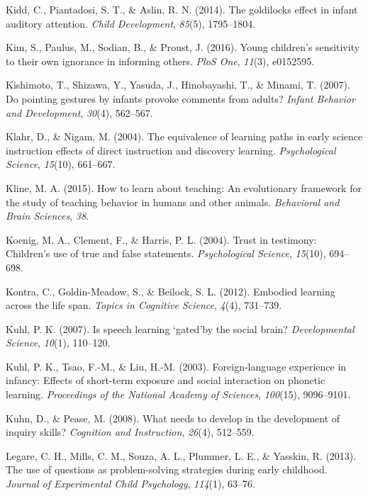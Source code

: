\documentclass[english,floatsintext,man]{apa6}
\theoremstyle{definition}
\theoremstyle{definition}
\theoremstyle{definition}
\theoremstyle{remark}
\begin{document}
\hypertarget{ref-kidd2014goldilocks}{}
Kidd, C., Piantadosi, S. T., \& Aslin, R. N. (2014). The goldilocks
effect in infant auditory attention. \emph{Child Development},
\emph{85}(5), 1795--1804.

\hypertarget{ref-kim2016young}{}
Kim, S., Paulus, M., Sodian, B., \& Proust, J. (2016). Young children's
sensitivity to their own ignorance in informing others. \emph{PloS One},
\emph{11}(3), e0152595.

\hypertarget{ref-kishimoto2007pointing}{}
Kishimoto, T., Shizawa, Y., Yasuda, J., Hinobayashi, T., \& Minami, T.
(2007). Do pointing gestures by infants provoke comments from adults?
\emph{Infant Behavior and Development}, \emph{30}(4), 562--567.

\hypertarget{ref-klahr2004equivalence}{}
Klahr, D., \& Nigam, M. (2004). The equivalence of learning paths in
early science instruction effects of direct instruction and discovery
learning. \emph{Psychological Science}, \emph{15}(10), 661--667.

\hypertarget{ref-kline2015learn}{}
Kline, M. A. (2015). How to learn about teaching: An evolutionary
framework for the study of teaching behavior in humans and other
animals. \emph{Behavioral and Brain Sciences}, \emph{38}.

\hypertarget{ref-koenig2004trust}{}
Koenig, M. A., Clement, F., \& Harris, P. L. (2004). Trust in testimony:
Children's use of true and false statements. \emph{Psychological
Science}, \emph{15}(10), 694--698.

\hypertarget{ref-kontra2012embodied}{}
Kontra, C., Goldin-Meadow, S., \& Beilock, S. L. (2012). Embodied
learning across the life span. \emph{Topics in Cognitive Science},
\emph{4}(4), 731--739.

\hypertarget{ref-kuhl2007speech}{}
Kuhl, P. K. (2007). Is speech learning `gated'by the social brain?
\emph{Developmental Science}, \emph{10}(1), 110--120.

\hypertarget{ref-kuhl2003foreign}{}
Kuhl, P. K., Tsao, F.-M., \& Liu, H.-M. (2003). Foreign-language
experience in infancy: Effects of short-term exposure and social
interaction on phonetic learning. \emph{Proceedings of the National
Academy of Sciences}, \emph{100}(15), 9096--9101.

\hypertarget{ref-kuhn2008needs}{}
Kuhn, D., \& Pease, M. (2008). What needs to develop in the development
of inquiry skills? \emph{Cognition and Instruction}, \emph{26}(4),
512--559.

\hypertarget{ref-legare2013use}{}
Legare, C. H., Mills, C. M., Souza, A. L., Plummer, L. E., \& Yasskin,
R. (2013). The use of questions as problem-solving strategies during
early childhood. \emph{Journal of Experimental Child Psychology},
\emph{114}(1), 63--76.
\end{document}
